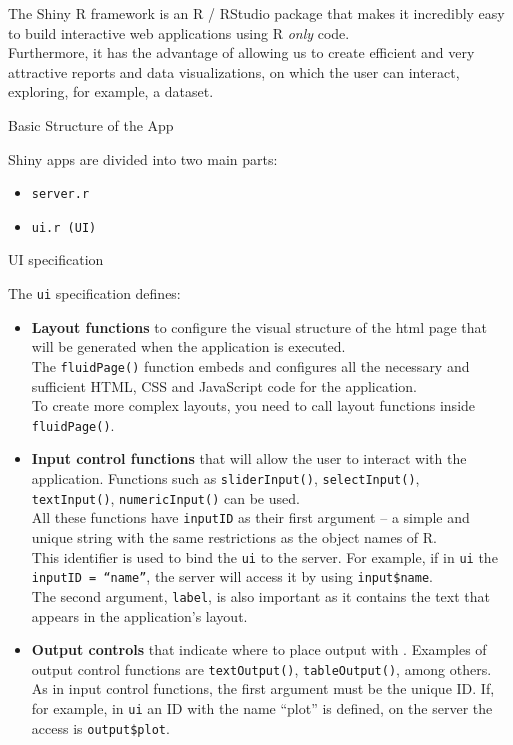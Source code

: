 
The Shiny R framework is an R / RStudio package that makes it incredibly easy to build interactive web applications using R {\emph {only}} code.
\\
Furthermore, it has the advantage of allowing us to create efficient and very attractive reports and data visualizations, on which the user can interact, exploring, for example, a dataset.
\begin{description}
\item[Basic Structure of the App]
\end{description}
Shiny apps are divided into two main parts: 

\begin{itemize}
    \item \verb!server.r!
    \item \verb!ui.r (UI)!
    
\end{itemize}
 \begin{description}
\item[UI specification]
\end{description}
The \verb!ui! specification defines:
\begin{itemize}
    \item  \textbf{Layout functions} to configure the visual structure of the html page that will be generated when the application is executed. 
    \\
    The \verb!fluidPage()! function embeds and configures all the necessary and sufficient HTML, CSS and JavaScript code for the application. 
    \\
    To create more complex layouts, you need to call layout functions inside \verb!fluidPage()!.
    \item \textbf{Input control functions} that will allow the user to interact with the application. Functions such as \verb!sliderInput()!, \verb!selectInput()!,
    \\
    \verb!textInput()!, \verb!numericInput()! can be used. 
    \\
    All these functions have \verb!inputID! as their first argument --  a simple and unique string with the same restrictions as the object names of R.
    \\
    This identifier is used to bind the \verb!ui! to the server. For example, if in  \verb!ui! the \verb!inputID = “name”!, the server will access it by using \verb!input$name!. 
    \\
    The second argument, \verb!label!, is also important as it contains the text that appears in the application's layout.
    \item \textbf{Output controls} that indicate where to place output with {}. 
    Examples of output control functions are \verb!textOutput()!, \verb!tableOutput()!, among others. 
    \\
    As in input control functions, the first argument must be the unique ID.
    If, for example, in \verb!ui! an ID with the name “plot” is defined, on the server the access is \verb!output$plot!.

\end{itemize}
